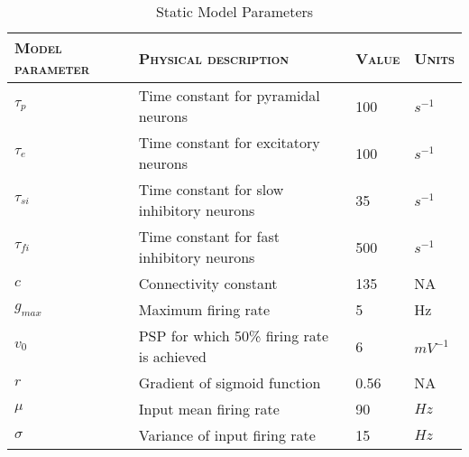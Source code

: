 \begin{center}%
	\begin{table}
			\caption{Static Model Parameters}
		\begin{tabular}{||p{4cm}|p{6cm}|p{1.5cm}|p{1.2cm}||}\hline
			 \textsc{Model parameter}  & \textsc{Physical description} & \textsc{Value} & \textsc{Units}  \\\hline\hline
			 $\tau_{p}$ & Time constant for pyramidal neurons & 100 & $s^{-1}$\\\hline
			 $\tau_{e}$ & Time constant for excitatory neurons & 100 & $s^{-1}$\\\hline
			 $\tau_{si}$ & Time constant for slow inhibitory neurons & 35 & $s^{-1}$\\\hline
			 $\tau_{fi}$ & Time constant for fast inhibitory neurons & 500 & $s^{-1}$\\\hline
			 $c$ & Connectivity constant & 135 & NA\\\hline
			 $g_{max}$ & Maximum firing rate & 5 & Hz \\\hline
			 $v_{0}$ & PSP for which 50\% firing rate is achieved & 6 & $mV^{-1}$\\\hline
			 $r$ & Gradient of sigmoid function & 0.56 & NA \\\hline
			 $\mu$ & Input mean firing rate & 90 & $Hz$\\\hline
			 $\sigma$ & Variance of input firing rate & 15 & $Hz$\\\hline\hline 
		\end{tabular}
		\label{tab: Static}
	\end{table}
\end{center}%
